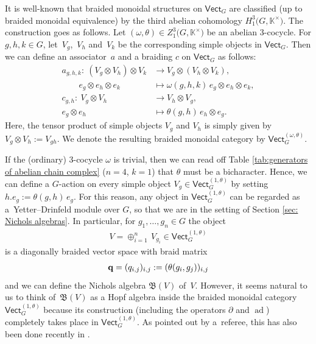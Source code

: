 \documentclass[pdftex]{sigma}
\numberwithin{equation}{section}
\newcommand{\qq }{{\bf q}}
\newcommand{\KK }{\mathbb{K}}
\newcommand{\BB }{\mathfrak{B}}
\DeclareMathOperator{\ad}{ad}
\begin{document}
It is well-known \cite[Example~8.4.8]{b-EGNO-15} that braided monoidal structures on $\mathsf{Vect}_G$ are classified (up to braided monoidal equivalence) by the third abelian cohomology $H^3_1\big(G,\KK^\times\big)$. The construction goes as follows. Let $(\omega,\theta) \in Z^3_1\big(G,\KK^\times\big)$ be an abelian 3-cocycle. For $g,h,k \in G$, let~$V_g$,~$V_h$ and~$V_k$ be the corresponding simple objects in $\mathsf{Vect}_G$. Then we can define an associator~$a$ and a braiding $c$ on $\mathsf{Vect}_G$ as follows:
\begin{align*}
 a_{g,h,k}\colon \ (V_g\otimes V_h) \otimes V_k &\longrightarrow V_g\otimes (V_h \otimes V_k),\\
 \qquad e_g\otimes e_h \otimes e_k &\longmapsto \omega(g,h,k) \, e_g\otimes e_h \otimes e_k,\\
 c_{g,h}\colon \ V_g \otimes V_h &\longrightarrow V_h \otimes V_g,\\
 e_g\otimes e_h &\longmapsto \theta( g,h)\, e_h \otimes e_g.
\end{align*}
Here, the tensor product of simple objects $V_g$ and $V_h$ is simply given by $V_g \otimes V_h := V_{gh}$. We denote the resulting braided monoidal category by $\mathsf{Vect}_G^{(\omega,\theta)}$.

If the (ordinary) 3-cocycle $\omega$ is trivial, then we can read off Table \ref{tab:generators of abelian chain complex} ($n=4$, $k=1$) that $\theta$ must be a bicharacter. Hence, we can define a $G$-action on every simple object $V_g \in \mathsf{Vect}_G^{(1,\theta)}$ by setting $h.e_g:=\theta(g,h)\,e_g$. For this reason, any object in $\mathsf{Vect}_G^{(1,\theta)}$ can be regarded as a~Yetter--Drinfeld module over $G$, so that we are in the setting of Section \ref{sec: Nichols algebras}. In particular, for $g_1, \dots, g_n \in G$ the object
\begin{align*}
 V=\oplus_{i=1}^n\,V_{g_i} \in \mathsf{Vect}_G^{(1,\theta)}
\end{align*}
is a diagonally braided vector space with braid matrix
\begin{align*}
 \qq = (q_{i,j})_{i,j} := (\theta(g_i,g_j))_{i,j}
\end{align*}
and we can define the Nichols algebra $\BB(V)$ of~$V$. However, it seems natural to us to think of~$\BB(V)$ as a Hopf algebra inside the braided monoidal category $\mathsf{Vect}_G^{(1,\theta)}$ because its construction (including the operators $\partial$ and $\ad$) completely takes place in $\mathsf{Vect}_G^{(1,\theta)}$.
As pointed out by a~referee, this has also been done recently in \cite[Section~5.2]{MR4498166}.
\end{document}
